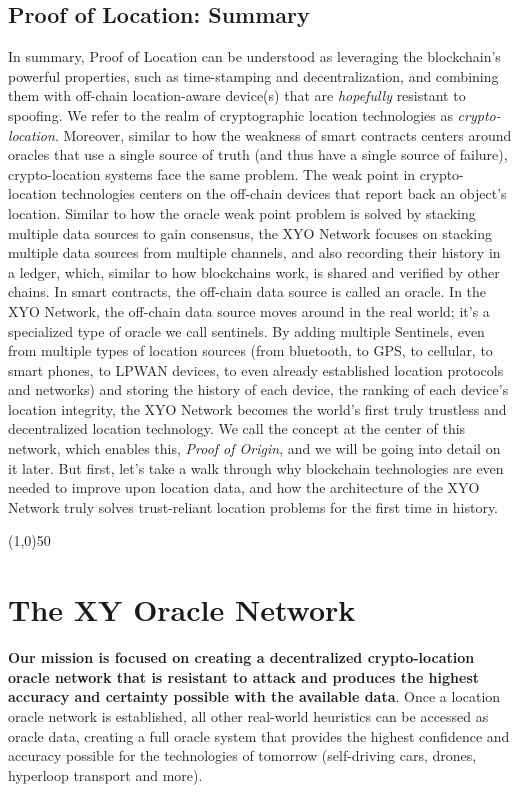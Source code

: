 \documentclass{article}
\begin{document}
\subsection {Proof of Location: Summary}
In summary, Proof of Location can be understood as leveraging the blockchain's powerful properties, such as time-stamping and decentralization, and combining them with off-chain location-aware device(s) that are \textit{hopefully} resistant to spoofing. We refer to the realm of cryptographic location technologies as \textit{crypto-location}. Moreover, similar to how the weakness of smart contracts centers around oracles that use a single source of truth (and thus have a single source of failure), crypto-location systems face the same problem. The weak point in crypto-location technologies centers on the off-chain devices that report back an object's location. Similar to how the oracle weak point problem is solved by stacking multiple data sources to gain consensus, the XYO Network focuses on stacking multiple data sources from multiple channels, and also recording their history in a ledger, which, similar to how blockchains work, is shared and verified by other chains. In smart contracts, the off-chain data source is called an oracle. In the XYO Network, the off-chain data source moves around in the real world; it's a specialized type of oracle we call \Glspl{sentinel}. By adding multiple Sentinels, even from multiple types of location sources (from bluetooth, to GPS, to cellular, to smart phones, to LPWAN devices, to even already established location protocols and networks) and storing the history of each device, the ranking of each device's location integrity, the XYO Network becomes the world's first truly trustless and decentralized location technology. We call the concept at the center of this network, which enables this, \textit{Proof of Origin}, and we will be going into detail on it later. But first, let's take a walk through why blockchain technologies are even needed to improve upon location data, and how the architecture of the XYO Network truly solves trust-reliant location problems for the first time in history.
\begin{center}
\line(1,0){50}
\end{center}



\section {The XY Oracle Network}
\textbf{Our mission is focused on creating a decentralized crypto-location \gls{oracle} network that is resistant to attack and produces the highest \gls{accuracy} and \gls{certainty} possible with the available data}. Once a location oracle network is established, all other real-world \glspl{heuristic} can be accessed as oracle data, creating a full oracle system that provides the highest confidence and accuracy possible for the technologies of tomorrow (self-driving cars, drones, hyperloop transport and more).
\end{document}
